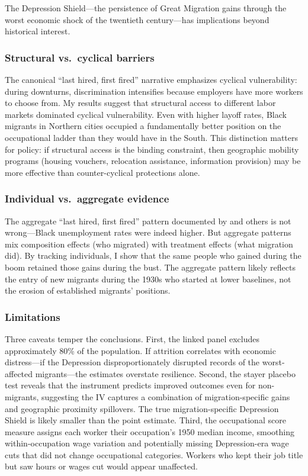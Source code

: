 \documentclass[12pt]{article}
\begin{document}
The Depression Shield---the persistence of Great Migration gains through the worst economic shock of the twentieth century---has implications beyond historical interest.

\subsubsection*{Structural vs.\ cyclical barriers} The canonical ``last hired, first fired'' narrative emphasizes cyclical vulnerability: during downturns, discrimination intensifies because employers have more workers to choose from. My results suggest that structural access to different labor markets dominated cyclical vulnerability. Even with higher layoff rates, Black migrants in Northern cities occupied a fundamentally better position on the occupational ladder than they would have in the South. This distinction matters for policy: if structural access is the binding constraint, then geographic mobility programs (housing vouchers, relocation assistance, information provision) may be more effective than counter-cyclical protections alone.

\subsubsection*{Individual vs.\ aggregate evidence} The aggregate ``last hired, first fired'' pattern documented by \citet{sundstrom1992} and others is not wrong---Black unemployment rates were indeed higher. But aggregate patterns mix composition effects (who migrated) with treatment effects (what migration did). By tracking individuals, I show that the same people who gained during the boom retained those gains during the bust. The aggregate pattern likely reflects the entry of new migrants during the 1930s who started at lower baselines, not the erosion of established migrants' positions.

\subsubsection*{Limitations} Three caveats temper the conclusions. First, the linked panel excludes approximately 80\% of the population. If attrition correlates with economic distress---if the Depression disproportionately disrupted records of the worst-affected migrants---the estimates overstate resilience. Second, the stayer placebo test reveals that the instrument predicts improved outcomes even for non-migrants, suggesting the IV captures a combination of migration-specific gains and geographic proximity spillovers. The true migration-specific Depression Shield is likely smaller than the point estimate. Third, the occupational score measure assigns each worker their occupation's 1950 median income, smoothing within-occupation wage variation and potentially missing Depression-era wage cuts that did not change occupational categories. Workers who kept their job title but saw hours or wages cut would appear unaffected.
\end{document}
